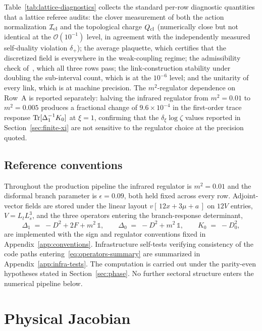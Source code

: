 \documentclass[a4paper,11pt]{article}
\theoremstyle{definition}
\newcommand{\Tr}{\mathop{\rm Tr}}
\newcommand{\Icl}{\mathcal{I}_{\rm cl}}
\begin{document}
Table~\ref{tab:lattice-diagnostics} collects the standard per-row
diagnostic quantities that a lattice referee audits: the clover
measurement of both the action normalization $\Icl$ and the
topological charge $Q_{\rm cl}$ (numerically close but not identical
at the $\mathcal{O}(10^{-1})$ level, in agreement with the
independently measured self-duality violation $\delta_+$); the
average plaquette, which certifies that the discretized field is
everywhere in the weak-coupling regime; the admissibility check
of~\cite{Luscher-admissibility}, which all three rows pass; the
link-construction stability under doubling the sub-interval count,
which is at the $10^{-6}$ level; and the unitarity of every link,
which is at machine precision. The $m^2$-regulator dependence on
Row~A is reported separately: halving the infrared regulator from
$m^2 = 0.01$ to $m^2 = 0.005$ produces a fractional change of
$9.6\times 10^{-4}$ in the first-order trace response
$\Tr[\Delta_1^{-1} K_0]$ at $\xi = 1$, confirming that the
$\delta_\xi\log\zeta$ values reported in
Section~\ref{sec:finite-xi} are not sensitive to the regulator
choice at the precision quoted.

\subsection{Reference conventions}
\label{subsec:reference-conventions}

Throughout the production pipeline the infrared regulator is
$m^2 = 0.01$ and the disformal branch parameter is $\epsilon = 0.09$,
both held fixed across every row. Adjoint-vector fields are stored
under the linear layout $v[\,12 x + 3\mu + a\,]$ on $12V$ entries,
$V = L_t L_s^3$, and the three operators entering the branch-response
determinant,
\begin{equation}
\Delta_1 \;=\; -D^2 + 2F + m^2\,\mathbb{1},
\qquad
\Delta_0 \;=\; -D^2 + m^2\,\mathbb{1},
\qquad
K_0 \;=\; -D_0^2,
\label{eq:operators-summary}
\end{equation}
are implemented with the sign and regulator conventions fixed in
Appendix~\ref{app:conventions}. Infrastructure self-tests verifying
consistency of the code paths entering~\eqref{eq:operators-summary}
are summarized in Appendix~\ref{app:infra-tests}. The computation is
carried out under the parity-even hypotheses stated in
Section~\ref{sec:phase}. No further sectoral structure enters the
numerical pipeline below.



\section{Physical Jacobian}
\label{sec:jacobian}
\end{document}
